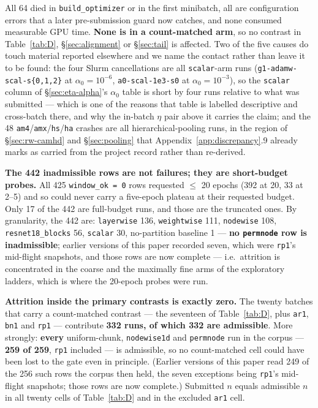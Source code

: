 \documentclass[10pt,letterpaper]{article}
\newcommand{\arm}[1]{\texttt{#1}}
\begin{document}
All 64 died in \texttt{build\_optimizer} or in the first minibatch, all are configuration errors
that a later pre-submission guard now catches, and none consumed measurable GPU time. \textbf{None
is in a count-matched arm}, so no contrast in Table~\ref{tab:D}, \S\ref{sec:alignment} or
\S\ref{sec:tail} is affected. Two of the five causes do touch material reported elsewhere and we
name the contact rather than leave it to be found: the four Slurm cancellations are all
\arm{scalar}-arm runs (\arm{g1-adamw-scal-s\{0,1,2\}} at $\alpha_0 = 10^{-6}$,
\arm{a0-scal-1e3-s0} at $\alpha_0 = 10^{-3}$), so the \arm{scalar} column of
\S\ref{sec:eta-alpha}'s $\alpha_0$ table is short by four runs relative to what was submitted ---
which is one of the reasons that table is labelled descriptive and cross-batch there, and why the
in-batch $\eta$ pair above it carries the claim; and the 48 \arm{am4}/\arm{amx}/\arm{hs}/\arm{ha}
crashes are all hierarchical-pooling runs, in the region of \S\ref{sec:rw-camhd} and
\S\ref{sec:pooling} that Appendix~\ref{app:discrepancy}.9 already marks as carried from the project
record rather than re-derived.

\textbf{The 442 inadmissible rows are not failures; they are short-budget probes.} All 425
\texttt{window\_ok = 0} rows requested $\le$ 20 epochs (392 at 20, 33 at 2--5) and so could never
carry a five-epoch plateau at their requested budget. Only 17 of the 442 are full-budget runs, and
those are the truncated ones. By granularity, the 442 are: \arm{layerwise} 136, \arm{weightwise}
111, \arm{nodewise} 108, \arm{resnet18\_blocks} 56, \arm{scalar} 30,
no-partition baseline 1 --- \textbf{no \arm{permnode} row is inadmissible}; earlier versions of this paper
recorded seven, which were \arm{rp1}'s mid-flight snapshots, and those rows are now complete ---
i.e.\ attrition is concentrated in the coarse and the maximally fine arms of the exploratory
ladders, which is where the 20-epoch probes were run.

\textbf{Attrition inside the primary contrasts is exactly zero.} The twenty batches that carry a
count-matched contrast --- the seventeen of Table~\ref{tab:D}, plus \arm{ar1}, \arm{bn1} and
\arm{rp1} --- contribute \textbf{332 runs, of which 332 are admissible}. More strongly:
\textbf{every} uniform-chunk, \arm{nodewise1d} and \arm{permnode} run in the corpus ---
\textbf{259 of 259}, \arm{rp1} included
--- is admissible, so no count-matched cell could have been lost to the gate even in principle.
(Earlier versions of this paper read 249 of the 256 such rows the corpus then held, the seven
exceptions being \arm{rp1}'s mid-flight snapshots;
those rows are now complete.)
Submitted $n$ equals admissible $n$ in all twenty cells of Table~\ref{tab:D} and in the excluded
\arm{ar1} cell.
\end{document}
